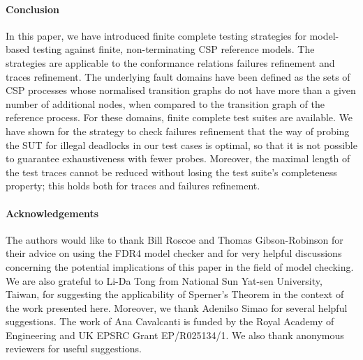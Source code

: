 \documentclass[3p,times]{elsarticle}
\begin{document}
\paragraph{Conclusion}
In this paper, we have introduced finite complete testing strategies for
model-based testing against finite, non-terminating CSP reference models. The
strategies are applicable to the conformance relations failures refinement
and traces refinement. The underlying fault domains have been defined as the
sets of CSP processes whose normalised transition graphs do not have more
than a given number of additional nodes, when compared to the transition
graph of the reference process. For these domains, finite complete test
suites are available. We have shown for the strategy to check failures
refinement that the way of probing the SUT for illegal deadlocks in our test
cases is optimal, so that it is not possible to guarantee exhaustiveness with
fewer probes. Moreover, the maximal length of the test traces cannot be
reduced without losing the test suite's completeness property; this holds
both for traces and failures refinement.


\paragraph{Acknowledgements}
The authors would like to thank Bill Roscoe and Thomas Gibson-Robinson for
their advice on using the FDR4 model checker and for very helpful discussions
concerning the potential implications of this paper in the field of model
checking. We are also grateful to Li-Da Tong from National Sun Yat-sen
University, Taiwan, for suggesting the applicability of Sperner's Theorem in
the context of the work presented here. Moreover, we thank Adenilso Simao for
several helpful suggestions. The work of Ana Cavalcanti is funded by the
Royal Academy of Engineering and UK EPSRC Grant EP/R025134/1. We also thank
anonymous reviewers for useful suggestions.


\end{document}

